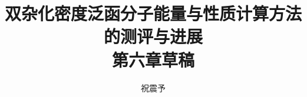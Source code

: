 



\title{\textbf{双杂化密度泛函分子能量与性质计算方法的测评与进展\\第六章草稿}}
\author{祝震予}
\maketitle
\vspace{-10pt}

\tableofcontents


\setcounter{section}{5}



\newpage






